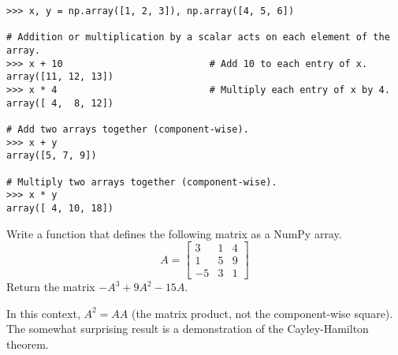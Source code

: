 \begin{lstlisting}
>>> x, y = np.array([1, 2, 3]), np.array([4, 5, 6])

# Addition or multiplication by a scalar acts on each element of the array.
>>> x + 10                          # Add 10 to each entry of x.
array([11, 12, 13])
>>> x * 4                           # Multiply each entry of x by 4.
array([ 4,  8, 12])

# Add two arrays together (component-wise).
>>> x + y
array([5, 7, 9])

# Multiply two arrays together (component-wise).
>>> x * y
array([ 4, 10, 18])
\end{lstlisting}


\begin{comment}
\begin{warn} %
Matrix multiplication is executed via \li{np.dot()} or \li{@} and scalar (component-wise) multiplication is executed via the \li{*} operator.
The equation below is an example of scalar multiplication, which uses \li{*}.
\begin{align*}
2 \left[\begin{array}{rrr}
1 & 2 & 3\\
4 & 5 & 6 \end{array}\right]
= \left[\begin{array}{rrr}
2 & 4 & 6\\
8 & 10 & 12 \end{array}\right]
\end{align*}
\end{warn}
\end{comment}

\begin{problem} %
Write a function that defines the following matrix as a NumPy array.
\[
A = \left[\begin{array}{rrr}
3 & 1 & 4\\
1 & 5 & 9 \\
-5 & 3 & 1 \end{array}\right]
\]
Return the matrix $-A^3 + 9A^2 - 15A$.

In this context, $A^2 = AA$ (the matrix product, not the component-wise square).
The somewhat surprising result is a demonstration of the Cayley-Hamilton theorem.
\end{problem}


